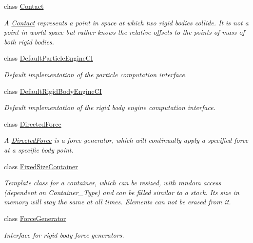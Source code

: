 \begin{DoxyCompactItemize}
class \mbox{\hyperlink{classr3_1_1_contact}{Contact}}
\begin{DoxyCompactList}\small\item\em A \mbox{\hyperlink{classr3_1_1_contact}{Contact}} represents a point in space at which two rigid bodies collide. It is not a point in world space but rather knows the relative offsets to the points of mass of both rigid bodies. \end{DoxyCompactList}\item 
class \mbox{\hyperlink{classr3_1_1_default_particle_engine_c_i}{Default\+Particle\+Engine\+CI}}
\begin{DoxyCompactList}\small\item\em Default implementation of the particle computation interface. \end{DoxyCompactList}\item 
class \mbox{\hyperlink{classr3_1_1_default_rigid_body_engine_c_i}{Default\+Rigid\+Body\+Engine\+CI}}
\begin{DoxyCompactList}\small\item\em Default implementation of the rigid body engine computation interface. \end{DoxyCompactList}\item 
class \mbox{\hyperlink{classr3_1_1_directed_force}{Directed\+Force}}
\begin{DoxyCompactList}\small\item\em A \mbox{\hyperlink{classr3_1_1_directed_force}{Directed\+Force}} is a force generator, which will continually apply a specified force at a specific body point. \end{DoxyCompactList}\item 
class \mbox{\hyperlink{classr3_1_1_fixed_size_container}{Fixed\+Size\+Container}}
\begin{DoxyCompactList}\small\item\em Template class for a container, which can be resized, with random access (dependent on Container\+\_\+\+Type) and can be filled similar to a stack. Its size in memory will stay the same at all times. Elements can not be erased from it. \end{DoxyCompactList}\item 
class \mbox{\hyperlink{classr3_1_1_force_generator}{Force\+Generator}}
\begin{DoxyCompactList}\small\item\em Interface for rigid body force generators. \end{DoxyCompactList}\item 

\end{DoxyCompactItemize}
